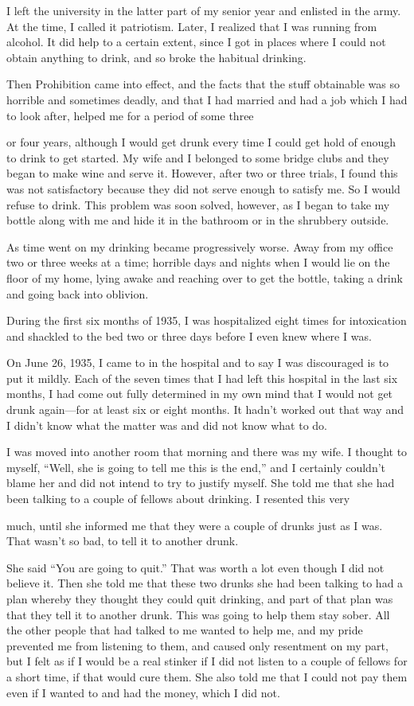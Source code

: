 \begin{biblechapter}
I left the university in the latter part of my senior year and enlisted in the army. At the time, I called it patriotism. Later, I realized that I was running from alcohol. It did help to a certain extent, since I got in places where I could not obtain anything to drink, and so broke the habitual drinking.

Then Prohibition came into effect, and the facts that the stuff obtainable was so horrible and sometimes deadly, and that I had married and had a job which I had to look after, helped me for a period of some three

or four years, although I would get drunk every time I could get hold of enough to drink to get started. My wife and I belonged to some bridge clubs and they began to make wine and serve it. However, after two or three trials, I found this was not satisfactory because they did not serve enough to satisfy me. So I would refuse to drink. This problem was soon solved, however, as I began to take my bottle along with me and hide it in the bathroom or in the shrubbery outside.

As time went on my drinking became progressively worse. Away from my office two or three weeks at a time; horrible days and nights when I would lie on the floor of my home, lying awake and reaching over to get the bottle, taking a drink and going back into oblivion.

During the first six months of 1935, I was hospitalized eight times for intoxication and shackled to the bed two or three days before I even knew where I was.

On June 26, 1935, I came to in the hospital and to say I was discouraged is to put it mildly. Each of the seven times that I had left this hospital in the last six months, I had come out fully determined in my own mind that I would not get drunk again—for at least six or eight months. It hadn’t worked out that way and I didn’t know what the matter was and did not know what to do.

I was moved into another room that morning and there was my wife. I thought to myself, “Well, she is going to tell me this is the end,” and I certainly couldn’t blame her and did not intend to try to justify myself. She told me that she had been talking to a couple of fellows about drinking. I resented this very

much, until she informed me that they were a couple of drunks just as I was. That wasn’t so bad, to tell it to another drunk.

She said “You are going to quit.” That was worth a lot even though I did not believe it. Then she told me that these two drunks she had been talking to had a plan whereby they thought they could quit drinking, and part of that plan was that they tell it to another drunk. This was going to help them stay sober. All the other people that had talked to me wanted to help me, and my pride prevented me from listening to them, and caused only resentment on my part, but I felt as if I would be a real stinker if I did not listen to a couple of fellows for a short time, if that would cure them. She also told me that I could not pay them even if I wanted to and had the money, which I did not.


\end{biblechapter}
